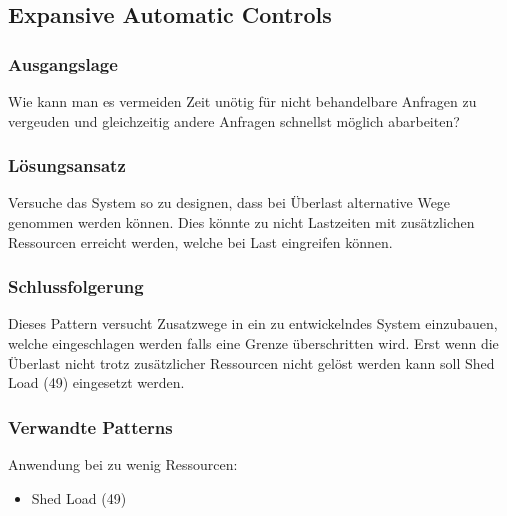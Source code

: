 \subsection{Expansive Automatic Controls}

\subsubsection*{Ausgangslage}

Wie kann man es vermeiden Zeit unötig für nicht behandelbare Anfragen zu vergeuden und gleichzeitig andere Anfragen schnellst möglich abarbeiten?

\subsubsection*{Lösungsansatz}

Versuche das System so zu designen, dass bei Überlast alternative Wege genommen werden können. Dies könnte zu nicht Lastzeiten mit zusätzlichen Ressourcen erreicht werden, welche bei Last eingreifen können.

\subsubsection*{Schlussfolgerung}

Dieses Pattern versucht Zusatzwege in ein zu entwickelndes System einzubauen, welche eingeschlagen werden falls eine Grenze überschritten wird. Erst wenn die Überlast nicht trotz zusätzlicher Ressourcen nicht gelöst werden kann soll Shed Load (49) eingesetzt werden.

\subsubsection*{Verwandte Patterns}

Anwendung bei zu wenig Ressourcen:
\begin{itemize}
	\item Shed Load (49)
\end{itemize}

